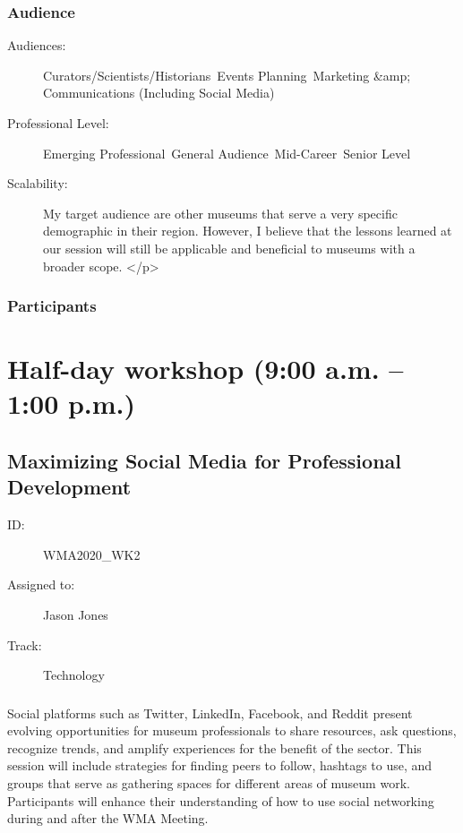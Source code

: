 \documentclass{report}
\begin{document}
              \subsection*{Audience}
                \begin{description}
                  \item [Audiences:]Curators/Scientists/Historians~Events Planning~Marketing &amp; Communications (Including Social Media)~
                  \item[Professional Level:]Emerging Professional~General Audience~Mid-Career~Senior Level~
                \item[Scalability:] My target audience are other museums that serve a very specific demographic in their region. However, I believe that the lessons learned at our session will still be applicable and beneficial to museums with a broader scope.
</p>
							
              \end{description}
            \subsection*{Participants}
              





    
  

  
    \newpage
    \chapter*{ Half-day workshop (9:00 a.m. – 1:00 p.m.) }

      
        
          \newpage
          \section{  Maximizing Social Media for Professional Development }
            \begin{description}
              \item [ID:]
              WMA2020\_WK2

              \item [Assigned to:]Jason Jones~
                \item [Track:]Technology~
              \end{description}
              \subsection*{}
                Social platforms such as Twitter, LinkedIn, Facebook, and Reddit present evolving opportunities for museum professionals to share resources, ask questions, recognize trends, and amplify experiences for the benefit of the sector. This session will include strategies for finding peers to follow, hashtags to use, and groups that serve as gathering spaces for different areas of museum work. Participants will enhance their understanding of how to use social networking during and after the WMA Meeting.
\end{document}
